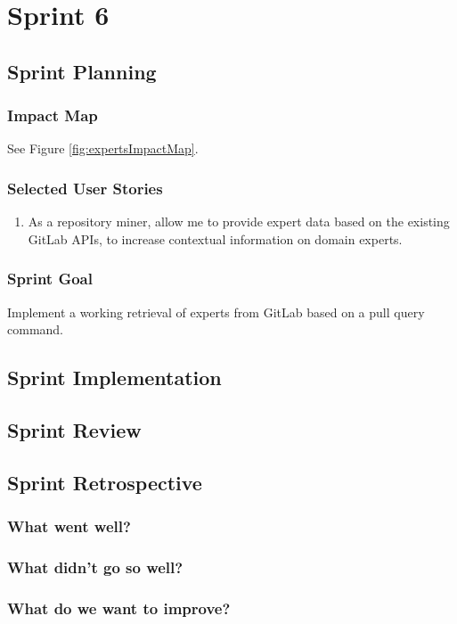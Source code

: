 \section{Sprint 6}

\subsection{Sprint Planning}

\subsubsection{Impact Map}
	
See Figure \ref{fig:expertsImpactMap}.

\subsubsection{Selected User Stories}

\begin{enumerate}
	\item As a repository miner, allow me to provide expert data based on the existing GitLab APIs, to increase contextual information on domain experts.
	
\end{enumerate}

\subsubsection{Sprint Goal}

Implement a working retrieval of experts from GitLab based on a pull query command.

\subsection{Sprint Implementation}

\subsection{Sprint Review}

\subsection{Sprint Retrospective}

\subsubsection{What went well?}

\subsubsection{What didn't go so well?}

\subsubsection{What do we want to improve?}